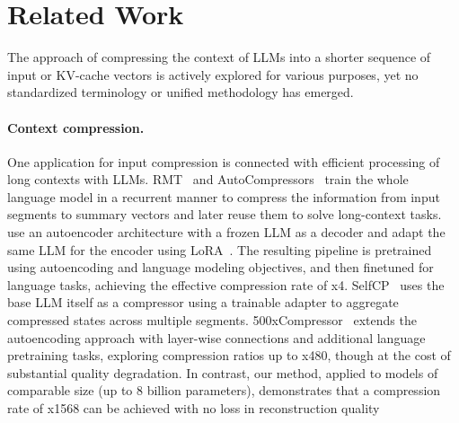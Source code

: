 \section{Related Work}



The approach of compressing the context of LLMs into a shorter sequence of input or KV-cache vectors is actively explored for various purposes, yet no standardized terminology or unified methodology has emerged. 
\paragraph{Context compression.} One application for input compression is connected with efficient processing of long contexts with LLMs. RMT~\cite{rmt_2022} and AutoCompressors~\cite{chevalier2023adapting} train the whole language model in a recurrent manner to compress the information from input segments to summary vectors and later reuse them to solve long-context tasks.~\citet{ge2023incontext} use an autoencoder architecture with a frozen LLM as a decoder and adapt the same LLM for the encoder using LoRA~\cite{hu2022lora}. The resulting pipeline is pretrained using autoencoding and language modeling objectives, and then finetuned for language tasks, achieving the effective compression rate of x4. SelfCP~\cite{gao2024selfcp} uses the base LLM itself as a compressor using a trainable adapter to aggregate compressed states across multiple segments. 500xCompressor~\cite{li2024500xcompressor} extends the autoencoding approach with layer-wise connections and additional language pretraining tasks, exploring compression ratios up to x480, though at the cost of substantial quality degradation. In contrast, our method, applied to models of comparable size (up to 8 billion parameters), demonstrates that a compression rate of x1568 can be achieved with no loss in reconstruction quality

